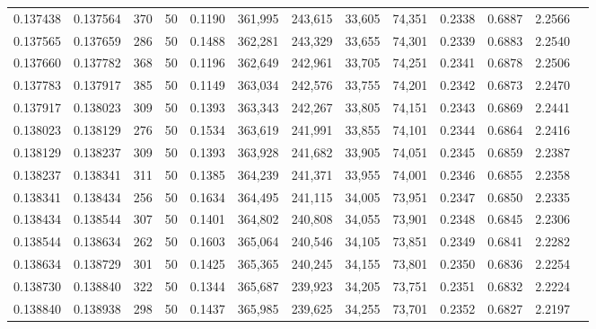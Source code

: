 \begin{tabular}{rrrrrrrrrrrrr}
0.137438 & 0.137564 &   370 &  50 &                                     0.1190 & 361,995 & 243,615 &  33,605 &  74,351 & 0.2338 & 0.6887 & 2.2566 \\
0.137565 & 0.137659 &   286 &  50 &                                     0.1488 & 362,281 & 243,329 &  33,655 &  74,301 & 0.2339 & 0.6883 & 2.2540 \\
0.137660 & 0.137782 &   368 &  50 &                                     0.1196 & 362,649 & 242,961 &  33,705 &  74,251 & 0.2341 & 0.6878 & 2.2506 \\
0.137783 & 0.137917 &   385 &  50 &                                     0.1149 & 363,034 & 242,576 &  33,755 &  74,201 & 0.2342 & 0.6873 & 2.2470 \\
0.137917 & 0.138023 &   309 &  50 &                                     0.1393 & 363,343 & 242,267 &  33,805 &  74,151 & 0.2343 & 0.6869 & 2.2441 \\
0.138023 & 0.138129 &   276 &  50 &                                     0.1534 & 363,619 & 241,991 &  33,855 &  74,101 & 0.2344 & 0.6864 & 2.2416 \\
0.138129 & 0.138237 &   309 &  50 &                                     0.1393 & 363,928 & 241,682 &  33,905 &  74,051 & 0.2345 & 0.6859 & 2.2387 \\
0.138237 & 0.138341 &   311 &  50 &                                     0.1385 & 364,239 & 241,371 &  33,955 &  74,001 & 0.2346 & 0.6855 & 2.2358 \\
0.138341 & 0.138434 &   256 &  50 &                                     0.1634 & 364,495 & 241,115 &  34,005 &  73,951 & 0.2347 & 0.6850 & 2.2335 \\
0.138434 & 0.138544 &   307 &  50 &                                     0.1401 & 364,802 & 240,808 &  34,055 &  73,901 & 0.2348 & 0.6845 & 2.2306 \\
0.138544 & 0.138634 &   262 &  50 &                                     0.1603 & 365,064 & 240,546 &  34,105 &  73,851 & 0.2349 & 0.6841 & 2.2282 \\
0.138634 & 0.138729 &   301 &  50 &                                     0.1425 & 365,365 & 240,245 &  34,155 &  73,801 & 0.2350 & 0.6836 & 2.2254 \\
0.138730 & 0.138840 &   322 &  50 &                                     0.1344 & 365,687 & 239,923 &  34,205 &  73,751 & 0.2351 & 0.6832 & 2.2224 \\
0.138840 & 0.138938 &   298 &  50 &                                     0.1437 & 365,985 & 239,625 &  34,255 &  73,701 & 0.2352 & 0.6827 & 2.2197 \\

\end{tabular}
